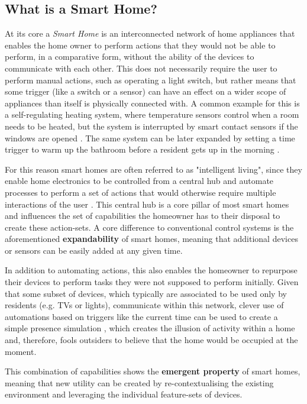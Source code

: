 \subsection{What is a Smart Home?}
At its core a \textit{Smart Home} is an interconnected network of home appliances that enables the home owner to perform actions that they would not be able to perform, in a comparative form, without the ability of the devices to communicate with each other. This does not necessarily require the user to perform manual actions, such as operating a light switch, but rather means that some trigger (like a switch or a sensor) can have an effect on a wider scope of appliances than itself is physically connected with. A common example for this is a self-regulating heating system, where temperature sensors control when a room needs to be heated, but the system is interrupted by smart contact sensors if the windows are opened \cite{BertkoChris2017HSH:}. The same system can be later expanded by setting a time trigger to warm up the bathroom before a resident gets up in the morning \cite{Tuohy2023SHP}.

For this reason smart homes are often referred to as "intelligent living"\cite{BertkoChris2017HSH:}, since they enable home electronics to be controlled from a central hub and automate processes to perform a set of actions that would otherwise require multiple interactions of the user \cite{BertkoChris2017HSH:}. This central hub is a core pillar of most smart homes and influences the set of capabilities the homeowner has to their disposal to create these action-sets. A core difference to conventional control systems is the aforementioned \textbf{expandability} of smart homes, meaning that additional devices or sensors can be easily added at any given time.

In addition to automating actions, this also enables the homeowner to repurpose their devices to perform tasks they were not supposed to perform initially. Given that some subset of devices, which typically are associated to be used only by residents (e.g. TVs or lights), communicate within this network, clever use of automations based on triggers like the current time can be used to create a simple presence simulation \cite{BertkoChris2017HSH:}, which creates the illusion of activity within a home and, therefore, fools outsiders to believe that the home would be occupied at the moment.

This combination of capabilities shows the \textbf{emergent property} of smart homes, meaning that new utility can be created by re-contextualising the existing environment and leveraging the individual feature-sets of devices.

